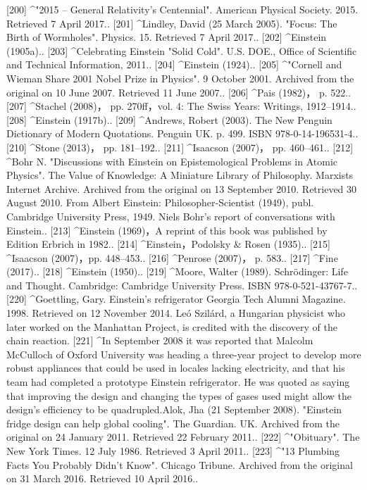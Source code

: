 [200]
^"2015 – General Relativity's Centennial". American Physical Society. 2015. Retrieved 7 April 2017..
[201]
^Lindley, David (25 March 2005). "Focus: The Birth of Wormholes". Physics. 15. Retrieved 7 April 2017..
[202]
^Einstein (1905a)..
[203]
^Celebrating Einstein "Solid Cold". U.S. DOE., Office of Scientific and Technical Information, 2011..
[204]
^Einstein (1924)..
[205]
^"Cornell and Wieman Share 2001 Nobel Prize in Physics". 9 October 2001. Archived from the original on 10 June 2007. Retrieved 11 June 2007..
[206]
^Pais (1982)， p. 522..
[207]
^Stachel (2008)， pp. 270ff，vol. 4: The Swiss Years: Writings, 1912–1914..
[208]
^Einstein (1917b)..
[209]
^Andrews, Robert (2003). The New Penguin Dictionary of Modern Quotations. Penguin UK. p. 499. ISBN 978-0-14-196531-4..
[210]
^Stone (2013)， pp. 181–192..
[211]
^Isaacson (2007)， pp. 460–461..
[212]
^Bohr N. "Discussions with Einstein on Epistemological Problems in Atomic Physics". The Value of Knowledge: A Miniature Library of Philosophy. Marxists Internet Archive. Archived from the original on 13 September 2010. Retrieved 30 August 2010. From Albert Einstein: Philosopher-Scientist (1949), publ. Cambridge University Press, 1949. Niels Bohr's report of conversations with Einstein..
[213]
^Einstein (1969)，A reprint of this book was published by Edition Erbrich in 1982..
[214]
^Einstein，Podolsky & Rosen (1935)..
[215]
^Isaacson (2007)，pp. 448–453..
[216]
^Penrose (2007)， p. 583..
[217]
^Fine (2017)..
[218]
^Einstein (1950)..
[219]
^Moore, Walter (1989). Schrödinger: Life and Thought. Cambridge: Cambridge University Press. ISBN 978-0-521-43767-7..
[220]
^Goettling, Gary. Einstein's refrigerator Georgia Tech Alumni Magazine. 1998. Retrieved on 12 November 2014. Leó Szilárd, a Hungarian physicist who later worked on the Manhattan Project, is credited with the discovery of the chain reaction.
[221]
^In September 2008 it was reported that Malcolm McCulloch of Oxford University was heading a three-year project to develop more robust appliances that could be used in locales lacking electricity, and that his team had completed a prototype Einstein refrigerator. He was quoted as saying that improving the design and changing the types of gases used might allow the design's efficiency to be quadrupled.Alok, Jha (21 September 2008). "Einstein fridge design can help global cooling". The Guardian. UK. Archived from the original on 24 January 2011. Retrieved 22 February 2011..
[222]
^"Obituary". The New York Times. 12 July 1986. Retrieved 3 April 2011..
[223]
^"13 Plumbing Facts You Probably Didn't Know". Chicago Tribune. Archived from the original on 31 March 2016. Retrieved 10 April 2016..
